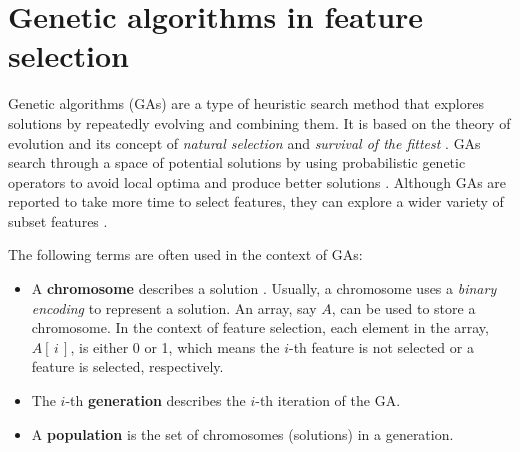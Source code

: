 \documentclass[12pt, twoside, a4paper]{report}
\begin{document}
\section{Genetic algorithms in feature selection} \label{bg:fs:ga}

Genetic algorithms (GAs) are a type of heuristic search method that explores solutions by repeatedly evolving and combining them. It is based on the theory of evolution and its concept of \textit{natural selection} and \textit{survival of the fittest} \cite{RefWorks:205}. GAs search through a space of potential solutions by using probabilistic genetic operators to avoid local optima and produce better solutions \cite{RefWorks:210, RefWorks:207, RefWorks:211}. Although GAs are reported to take more time to select features, they can explore a wider variety of subset features \cite{RefWorks:232}.

The following terms are often used in the context of GAs:
\begin{itemize}
  \item A \textbf{chromosome} describes a solution \cite{RefWorks:205, RefWorks:209}. Usually, a chromosome uses a \textit{binary encoding} to represent a solution. An array, say $A$, can be used to store a chromosome. In the context of feature selection, each element in the array, $A[\,i\,]$, is either 0 or 1, which means the $i$-th feature is not selected or a feature is selected, respectively.
  
  \item The $i$-th \textbf{generation} describes the $i$-th iteration of the GA.
  
  \item A \textbf{population} is the set of chromosomes (solutions) in a generation.
\end{itemize}
\end{document}
